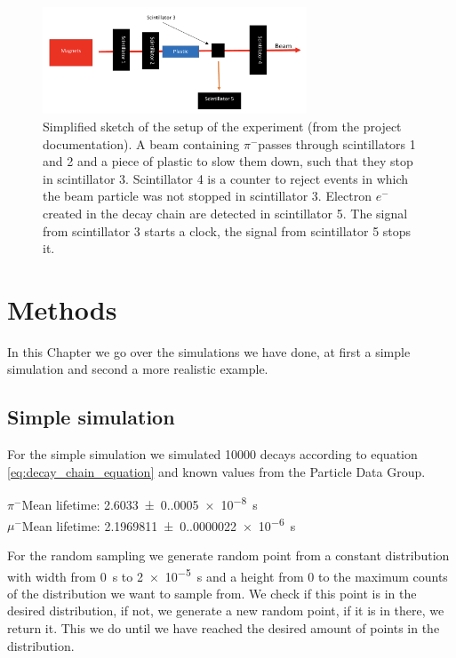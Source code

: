 \documentclass[11pt, a4paper, oneside]{book}
\newcommand{\electron}{$e^{-}$}
\newcommand{\pion}{$\pi^{-}$}
\newcommand{\muon}{$\mu^{-}$}
\begin{document}
\begin{figure}[h]
\begin{center}
\includegraphics[width=0.7\textwidth]{images/experimental_setup.png}
\end{center}
\caption{Simplified sketch of the setup of the experiment (from the project documentation). A beam containing \pion passes through scintillators 1 and 2 and a piece of plastic to slow them down, such that they stop in scintillator 3. Scintillator 4 is a counter to reject events in which the beam particle was not stopped in scintillator 3. Electron \electron created in the decay chain are detected in scintillator 5. The signal from scintillator 3 starts a clock, the signal from scintillator 5 stops it.}
\label{fig:experimental_setup}
\end{figure}


\FloatBarrier
\chapter{Methods}

In this Chapter we go over the simulations we have done, at first a simple simulation and second a more realistic example.

\section{Simple simulation}

For the simple simulation we simulated \num{10000} decays according to equation \ref{eq:decay_chain_equation} and known values from the Particle Data Group. \cite{ParticleDataGroup:2024cfk}

\pion Mean lifetime: \qty{2.6033(0.0005)e-8}{\s} \\
\muon Mean lifetime: \qty{2.1969811(0.0000022)e-6}{\s}

For the random sampling we generate random point from a constant distribution with width from \qty{0}{\s} to \qty{2e-5}{\s} and a height from 0 to the maximum counts of the distribution we want to sample from. We check if this point is in the desired distribution, if not, we generate a new random point, if it is in there, we return it. This we do until we have reached the desired amount of points in the distribution.
\end{document}
